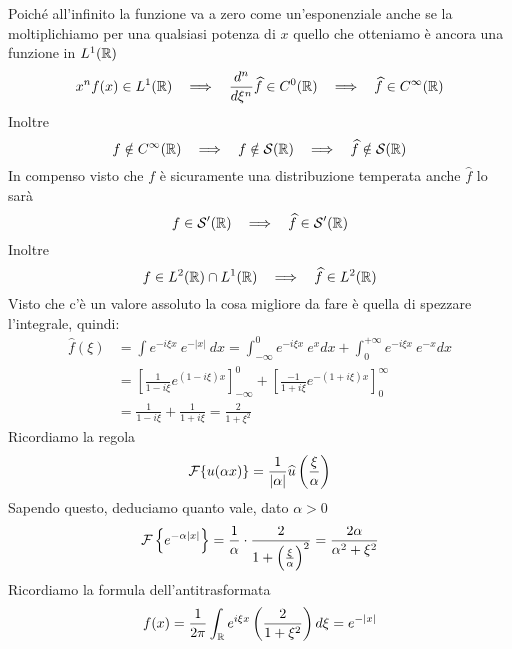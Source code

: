 Poiché all'infinito la funzione va a zero come un'esponenziale anche se la moltiplichiamo per una qualsiasi potenza di $x$ quello che otteniamo è ancora una funzione in $L^{1} (\mathbb{R})$
\begin{equation*}
x^{n} f(x)\in L^{1} (\RR)\ \ \implies \ \ \frac{d^{n}}{d\xi ^{n}}\hat{f} \in C^{0}(\RR) \ \ \implies \ \ \hat{f} \in C^{\infty } (\RR)
\end{equation*}
Inoltre
\begin{equation*}
f\notin C^{\infty } (\mathbb{R})\ \ \implies \ \ f\notin \mathcal{S} (\mathbb{R}) \ \ \implies \ \ \widehat{f} \notin \mathcal{S} (\mathbb{R})
\end{equation*}
In compenso visto che $f$ è sicuramente una distribuzione temperata anche $\hat{f}$ lo sarà
\begin{equation*}
f\in \Sc  '(\RR) \ \ \implies \ \ \hat{f} \in \Sc  '(\RR)
\end{equation*}
Inoltre
\begin{equation*}
f\in L^{2}(\RR) \cap L^{1}(\RR) \ \ \implies \ \ \hat{f} \in L^{2}(\RR)
\end{equation*}
Visto che c'è un valore assoluto la cosa migliore da fare è quella di spezzare l'integrale, quindi:
\begin{equation*}
\begin{aligned}
\hat{f} (\xi) & = \int e^{ - i\xi x} \ e^{ - |x|} \ dx = \int ^{0}_{ - \infty } e^{ - i\xi x} \ e^{x} dx + \int ^{ + \infty }_{0} e^{ - i\xi x} \ e^{ - x} dx\\
 & = \left[\frac{1}{1 - i\xi } e^{(1 - i\xi) x}\right]^{0}_{ - \infty } + \left[\frac{ - 1}{1 + i\xi } e^{ - (1 + i\xi) x}\right]^{\infty }_{0}\\
 & = \frac{1}{1 - i\xi } + \frac{1}{1 + i\xi } = \frac{2}{1 + \xi ^{2}}
\end{aligned}
\end{equation*}
Ricordiamo la regola
\begin{equation*}
\mathcal{F} \{u(\alpha x)\} = \frac{1}{| \alpha | }\widehat{u}\left(\frac{\xi }{\alpha }\right)
\end{equation*}
Sapendo questo, deduciamo quanto vale, dato $\alpha  > 0$
\begin{equation*}
\mathcal{F} \left\{e^{ - \alpha | x| }\right\} = \frac{1}{\alpha } \cdot \frac{2}{1 + \left(\frac{\xi }{\alpha }\right)^{2}} = \frac{2\alpha }{\alpha ^{2} + \xi ^{2}}
\end{equation*}
Ricordiamo la formula dell'antitrasformata
\begin{equation*}
f(x) = \frac{1}{2\pi }\int _{\mathbb{R} } e^{i\xi x}\left(\frac{2}{1 + \xi ^{2}}\right) d\xi = e^{ - |x|}
\end{equation*}
